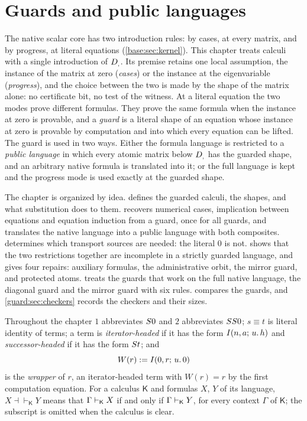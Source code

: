 \chapter{Guards and public languages}
\label{prov:ch:guard}
\label{guard:ch}

The native scalar core has two introduction rules:  by cases,
at every matrix, and  by progress, at literal equations
(\cref{base:sec:kernel}).  This chapter treats calculi with a single
introduction of $D_{,}$.  Its premise retains one local assumption, the
instance of the matrix at zero (\emph{cases}) or the instance at the
eigenvariable (\emph{progress}), and the choice between the two is made by
the shape of the matrix alone: no certificate bit, no test of the witness.
At a literal equation the two modes prove different formulas.  They prove
the same formula when the instance at zero is provable, and a \emph{guard}
is a literal shape of an equation whose instance at zero is provable by
computation and into which every equation can be lifted.  The guard is used
in two ways.  Either the formula language is restricted to a \emph{public
language} in which every atomic matrix below $D_{,}$ has the guarded shape,
and an arbitrary native formula is translated into it; or the full language
is kept and the progress mode is used exactly at the guarded shape.

The chapter is organized by idea.   defines the
guarded calculi, the shapes, and what substitution does to them.
 recovers numerical cases, implication between
equations and equation induction from a guard, once for all guards, and
translates the native language into a public language with both composites.
 determines which transport sources are needed: the
literal $0$ is not.   shows that the two
restrictions together are incomplete in a strictly guarded language, and
gives four repairs: auxiliary formulas, the administrative orbit, the mirror
guard, and protected atoms.   treats the guards that
work on the full native language, the diagonal guard and the mirror guard
with six rules.   compares the guards, and
\cref{guard:sec:checkers} records the checkers and their sizes.

Throughout the chapter $1$ abbreviates $S 0$ and $2$ abbreviates
$SS 0$; $s\equiv t$ is literal identity of terms; a term is
\emph{iterator-headed} if it has the form $I(n,a;\,u.\,h)$ and
\emph{successor-headed} if it has the form $S t$; and
\[
 W(r)\mathrel{:=}I(0,r;\,u.\,0)
\]
is the \emph{wrapper} of $r$, an iterator-headed term with $W(r)=r$ by the
first computation equation.  For a calculus $\mathsf K$ and formulas $X$,
$Y$ of its language, $X\dashv\vdash_{\mathsf K}Y$ means that
$\Gamma\vdash_{\mathsf K}X$ if and only if $\Gamma\vdash_{\mathsf K}Y$,
for every context $\Gamma$ of $\mathsf K$; the subscript is omitted when the
calculus is clear.

